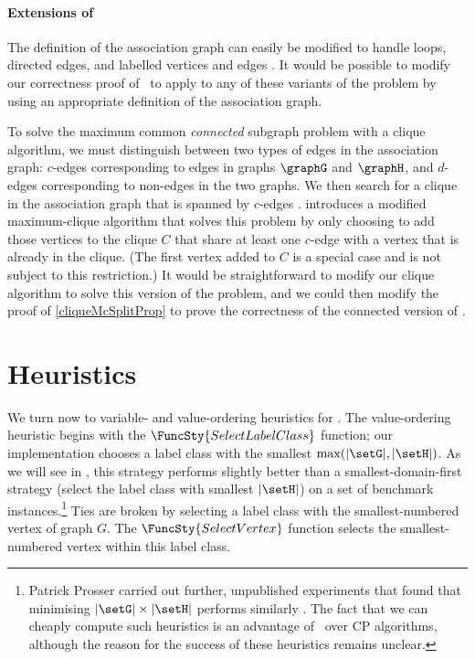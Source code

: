 \paragraph{Extensions of \McSplit}
The definition of the association graph can easily be modified to handle loops,
directed edges, and labelled vertices and edges \citep{LeviG}.  It would be
possible to modify our correctness proof of \McSplit\ to apply to any of these
variants of the problem by using an appropriate definition of the association
graph.

To solve the maximum common \emph{connected} subgraph problem with a clique algorithm,
we must distinguish between two types of edges in the association graph: $c$-edges
corresponding to edges in graphs $\graphG$ and $\graphH$, and $d$-edges corresponding
to non-edges in the two graphs.  We then search for a clique in the association graph
that is spanned by $c$-edges
\citep{DBLP:journals/tcs/Koch01,DBLP:conf/mco/VismaraV08,DBLP:conf/cp/McCreeshNPS16}.
\citet{DBLP:conf/cp/McCreeshNPS16} introduces a modified maximum-clique algorithm
that solves this problem by only choosing to add those vertices to the clique $C$ that
share at least one $c$-edge with a vertex that is already in the clique.  (The first
vertex added to $C$ is a special case and is not subject to this restriction.)
It would be straightforward to modify our clique algorithm to solve this version of the
problem, and we could then modify the proof of \cref{cliqueMcSplitProp} to prove the
correctness of the connected version of \McSplit.

\section{Heuristics}\label{sec:mcsplit-heuristics}

We turn now to variable- and value-ordering heuristics for \McSplit.
The value-ordering heuristic begins with the $\FuncSty{SelectLabelClass}$
function; our implementation chooses a label class with the smallest
$\max(|\setG|,|\setH|)$. As we will see in 
, this strategy performs slightly
better than a smallest-domain-first strategy (select the label class
with smallest $|\setH|$) on a set of benchmark instances.\footnote{Patrick
Prosser carried out further, unpublished experiments
that found that minimising $|\setG|\times|\setH|$ performs similarly
\citep{Prosser2017McSplitHeuristics}. The fact that we can cheaply compute
such heuristics is an advantage of \McSplit\ over CP algorithms, although
the reason for the success of these heuristics remains unclear.}
Ties are broken by selecting a label class with the smallest-numbered
vertex of graph $G$.
The $\FuncSty{SelectVertex}$ function selects the smallest-numbered vertex
within this label class.

